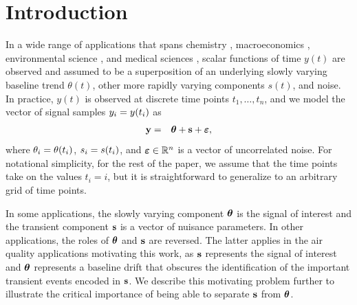 \documentclass[12pt]{article}
\newcommand{\Real}{\mathbb{R}}
\newcommand{\V}[1]{{\bm{\mathbf{\MakeLowercase{#1}}}}} %
\newcommand{\VE}[2]{\MakeLowercase{#1}_{#2}} %
\begin{document}
	\newpage
	
\section{Introduction}
\label{sec:intro}
	
In a wide range of applications that spans chemistry \citep{Ning2014}, macroeconomics \citep{yamada2017estimating}, environmental science \citep{brantley2014mobile}, and medical sciences \citep{pettersson2013algorithm, marandi2015qualitative}, scalar functions of time $y(t)$ are observed and assumed to be a superposition of an underlying slowly varying baseline trend $\theta(t)$, other more rapidly varying components $s(t)$, and noise. In practice, $y(t)$ is observed at discrete time points $t_1, \ldots, t_n$, and we model the vector of signal samples $\VE{y}{i} = y(t_i)$ as	
\begin{eqnarray*}
\V{y} & = & \V{\theta} + \V{s} + \V{\varepsilon},
\end{eqnarray*}
where $\VE{\theta}{i} = \theta(t_i)$, $\VE{s}{i} = s(t_i)$, and $\V{\varepsilon} \in \Real^n$ is a vector of uncorrelated noise. For notational simplicity, for the rest of the paper, we assume that the time points take on the values $t_i = i$, but it is straightforward to generalize to an arbitrary grid of time points.

In some applications, the slowly varying component $\V{\theta}$ is the signal of interest and the transient component $\V{s}$ is a vector of nuisance parameters. In other applications, the roles of $\V{\theta}$ and $\V{s}$ are reversed. The latter applies in the air quality applications motivating this work, as $\V{s}$ represents the signal of interest and $\V{\theta}$ represents a baseline drift that obscures the identification of the important transient events encoded in $\V{s}$. We describe this motivating problem further to illustrate the critical importance of being able to separate $\V{s}$ from $\V{\theta}$.
\end{document}
